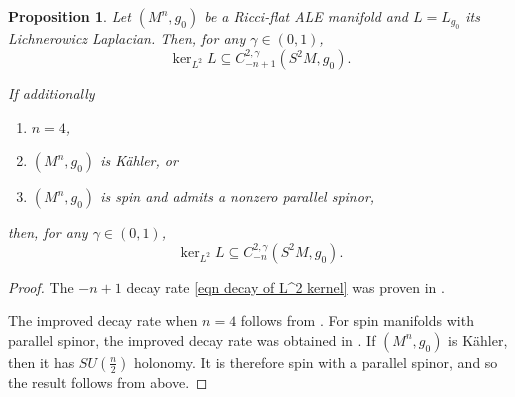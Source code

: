 \documentclass[12pt]{amsart}
\renewcommand{\1}{{\mathbf 1}}
\newtheorem{prop}[thm]{Proposition}
\theoremstyle{others}
\numberwithin{equation}{section}
\begin{document}
    
\begin{prop} \label{prop decay rate of L2 kernel elements}
    Let $(M^n, g_0)$ be a Ricci-flat ALE manifold and $L = L_{g_0}$ its Lichnerowicz Laplacian.
    Then, for any $\gamma \in (0,1)$,
    \begin{equation} \label{eqn decay of L^2 kernel}
        \ker_{L^2} L \subseteq C^{2, \gamma}_{-n+1} ( S^2M,g_0).
    \end{equation}

    If additionally
        \begin{enumerate}
            \item $n=4$,
            \item $(M^n, g_0)$ is K{\"a}hler, or
            \item $(M^n, g_0)$ is spin and admits a nonzero parallel spinor,
        \end{enumerate}
    then, for any $\gamma \in (0,1)$,
    \begin{equation} \label{eqn decay of L^2 kernel+}
        \ker_{L^2} L \subseteq C^{2, \gamma}_{-n}(S^2M, g_0) .
    \end{equation}
\end{prop}
\begin{proof}
    The $-n+1$ decay rate \eqref{eqn decay of L^2 kernel} was proven in \cite[Theorem 2.7, Remark 2.10]{DeruelleKroncke20}.

    The improved decay rate when $n=4$ follows from \cite{BKN89}.
    For spin manifolds with parallel spinor, the improved decay rate was obtained in \cite{KronckePetersen22}.
    If $(M^n, g_0)$ is K{\"a}hler, then it has $SU\left(\frac n2\right)$ holonomy. It is therefore spin with a parallel spinor, and so the result follows from above.
\end{proof}
\end{document}
